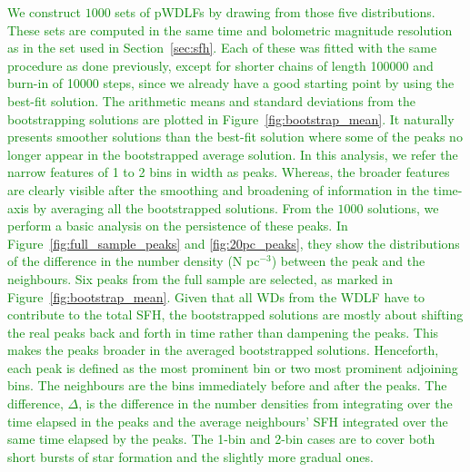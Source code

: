 \documentclass[fleqn,usenatbib]{mnras}
\begin{document}
\textcolor{green}{
We construct $1000$ sets of pWDLFs by drawing from those five distributions.
These sets are computed in the same time and bolometric magnitude resolution
as in the set used in Section~\ref{sec:sfh}. Each of these was fitted with
the same procedure as done previously, except for shorter chains of length
100000 and burn-in of 10000 steps, since we already have a good starting point
by using the best-fit solution. The arithmetic means and standard deviations
from the bootstrapping solutions are plotted in Figure~\ref{fig:bootstrap_mean}.
It naturally presents smoother solutions than the best-fit solution where some
of the peaks no longer appear in the bootstrapped average solution. In this
analysis, we refer the narrow features of 1 to 2 bins in width as peaks.
Whereas, the broader features are clearly visible after the smoothing and
broadening of information in the time-axis by averaging all the bootstrapped
solutions. From the $1000$ solutions, we perform a basic analysis on the
persistence of these peaks. In Figure~\ref{fig:full_sample_peaks} and 
\ref{fig:20pc_peaks}, they show the distributions of the difference in the
number density (N pc$^{-3}$) between the peak and the neighbours. Six peaks
from the full sample are selected, as marked in Figure~\ref{fig:bootstrap_mean}.
Given that all WDs from the WDLF have to contribute to the total SFH, the
bootstrapped solutions are mostly about shifting the real peaks back and forth
in time rather than dampening the peaks. This makes the peaks broader in the
averaged bootstrapped solutions. Henceforth, each peak is defined as the most
prominent bin or two most prominent adjoining bins. The neighbours are the
bins immediately before and after the peaks. The difference, $\Delta$, is the
difference in the number densities from integrating over the time elapsed in
the peaks and the average neighbours' SFH integrated over the same time elapsed
by the peaks. The 1-bin and 2-bin cases are to cover both short bursts of star
formation and the slightly more gradual ones.
}
\end{document}
